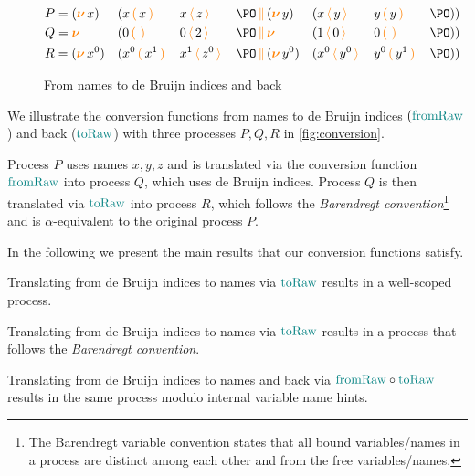 \begin{example}
  \begin{figure}[t]
    \begin{alignat*}{7}
      &P = (\new{x} ) && (\comp {\recv{x}{x} && \send{x}{z} && \PO} {(\new{y}) && (\send{x}{y} && \recv{y}{y} && \PO)}) \\
      &Q = \new{} && (\comp {\recv{0}{} && \send{0}{2} && \PO} {\new{} && (\send{1}{0} && \recv{0}{} && \PO)}) \\
      &R = (\new{x^0} ) && (\comp {\recv{x^0}{x^1} && \send{x^1}{z^0} && \PO} {(\new{y^0}) && (\send{x^0}{y^0} && \recv{y^0}{y^1} && \PO)})
    \end{alignat*}
    \caption{From names to de Bruijn indices and back}
    \label{fig:conversion}
    \end{figure}
  We illustrate the conversion functions from names to de Bruijn indices $(\textcolor{teal}{\operatorname{fromRaw}}$) and back ($\textcolor{teal}{\operatorname{toRaw}}$) with three processes $P,Q,R$  in \autoref{fig:conversion}.

  Process $P$ uses names $x,y,z$ and is translated via the conversion function $\textcolor{teal}{\operatorname{fromRaw}}$ into process $Q$, which uses de Bruijn indices.
  Process $Q$ is then translated via $\textcolor{teal}{\operatorname{toRaw}}$ into process $R$, which follows the \emph{Barendregt convention}\footnote{The Barendregt variable convention states that all bound variables/names in a process are distinct among each other and from the free variables/names.} and is $\alpha$-equivalent to the original process $P$.
\end{example}

In the following we present the main results that our conversion functions satisfy.

\begin{nilemma}
  Translating from de Bruijn indices to names via $\textcolor{teal}{\operatorname{toRaw}}$ results in a well-scoped process.
\end{nilemma}

\begin{nilemma}
  Translating from de Bruijn indices to names via $\textcolor{teal}{\operatorname{toRaw}}$ results in a process that follows the \emph{Barendregt convention}.
\end{nilemma}

\begin{nilemma}
  Translating from de Bruijn indices to names and back via $\textcolor{teal}{\operatorname{fromRaw}} \circ \textcolor{teal}{\operatorname{toRaw}}$ results in the same process modulo internal variable name hints.
\end{nilemma}

